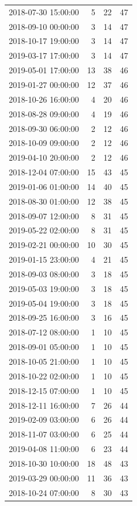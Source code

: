 \begin{tabular}{lrrr}
2018-07-30 15:00:00 & 5 & 22 & 47 \\
2018-09-10 00:00:00 & 3 & 14 & 47 \\
2018-10-17 19:00:00 & 3 & 14 & 47 \\
2019-03-17 17:00:00 & 3 & 14 & 47 \\
2019-05-01 17:00:00 & 13 & 38 & 46 \\
2019-01-27 00:00:00 & 12 & 37 & 46 \\
2018-10-26 16:00:00 & 4 & 20 & 46 \\
2018-08-28 09:00:00 & 4 & 19 & 46 \\
2018-09-30 06:00:00 & 2 & 12 & 46 \\
2018-10-09 09:00:00 & 2 & 12 & 46 \\
2019-04-10 20:00:00 & 2 & 12 & 46 \\
2018-12-04 07:00:00 & 15 & 43 & 45 \\
2019-01-06 01:00:00 & 14 & 40 & 45 \\
2018-08-30 01:00:00 & 12 & 38 & 45 \\
2018-09-07 12:00:00 & 8 & 31 & 45 \\
2019-05-22 02:00:00 & 8 & 31 & 45 \\
2019-02-21 00:00:00 & 10 & 30 & 45 \\
2019-01-15 23:00:00 & 4 & 21 & 45 \\
2018-09-03 08:00:00 & 3 & 18 & 45 \\
2019-05-03 19:00:00 & 3 & 18 & 45 \\
2019-05-04 19:00:00 & 3 & 18 & 45 \\
2018-09-25 16:00:00 & 3 & 16 & 45 \\
2018-07-12 08:00:00 & 1 & 10 & 45 \\
2018-09-01 05:00:00 & 1 & 10 & 45 \\
2018-10-05 21:00:00 & 1 & 10 & 45 \\
2018-10-22 02:00:00 & 1 & 10 & 45 \\
2018-12-15 07:00:00 & 1 & 10 & 45 \\
2018-12-11 16:00:00 & 7 & 26 & 44 \\
2019-02-09 03:00:00 & 6 & 26 & 44 \\
2018-11-07 03:00:00 & 6 & 25 & 44 \\
2019-04-08 11:00:00 & 6 & 23 & 44 \\
2018-10-30 10:00:00 & 18 & 48 & 43 \\
2019-03-29 00:00:00 & 11 & 36 & 43 \\
2018-10-24 07:00:00 & 8 & 30 & 43 \\

\end{tabular}
